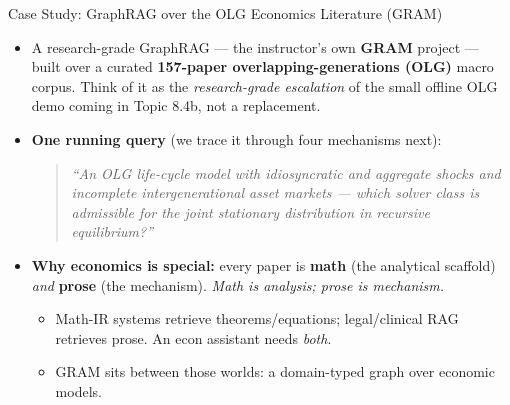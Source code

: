 \begin{frame}{Case Study: GraphRAG over the OLG Economics Literature (GRAM)}
\begin{itemize}
\item A research-grade GraphRAG --- the instructor's own \textbf{GRAM} project --- built over a curated \textbf{157-paper overlapping-generations (OLG)} macro corpus. Think of it as the \emph{research-grade escalation} of the small offline OLG demo coming in Topic 8.4b, not a replacement.

\medskip
\item \textbf{One running query} (we trace it through four mechanisms next):
\begin{quote}\itshape\small
``An OLG life-cycle model with idiosyncratic \emph{and} aggregate shocks and incomplete intergenerational asset markets --- which solver class is admissible for the joint stationary distribution in recursive equilibrium?''
\end{quote}

\item \textbf{Why economics is special:} every paper is \textbf{math} (the analytical scaffold) \emph{and} \textbf{prose} (the mechanism). \emph{Math is analysis; prose is mechanism.}
\begin{itemize}\small
    \item Math-IR systems retrieve theorems/equations; legal/clinical RAG retrieves prose. An econ assistant needs \emph{both}.
    \item GRAM sits between those worlds: a domain-typed graph over economic models.
\end{itemize}
\end{itemize}
\end{frame}

